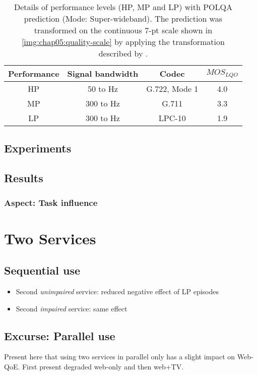 \begin{table}
 \centering
 \begin{tabulary}{\columnwidth}{C|C|C|C}
   Performance & Signal bandwidth & Codec & $MOS_{LQO}$ \\
   \midrule
   HP & 50 to \unit[7000]{Hz}  & G.722, Mode 1 & 4.0 \\ %
   \hline
   MP & 300 to \unit[3400]{Hz} & G.711         & 3.3 \\ %
   \hline
   LP & 300 to \unit[3400]{Hz} & LPC-10        & 1.9 \\ %
   \end{tabulary}
   \caption{Details of performance levels (\ac{HP}, \ac{MP} and \ac{LP}) with \ac{POLQA} prediction (Mode: Super-wideband). The prediction was transformed on the continuous 7-pt scale shown in \autoref{img:chap05:quality-scale} by applying the transformation described by  \cite{koster_comparison_2015}.}
   \label{tab:performance}
\end{table}

\subsection{Experiments}


\subsection{Results}

\subsubsection*{Aspect: Task influence}


\section{Two Services}
\subsection{Sequential use}
\begin{itemize}
\item Second \textit{unimpaired} service: reduced negative effect of LP episodes
\item Second \textit{impaired} service: same effect
\end{itemize}

\subsection{Excurse: Parallel use}
Present here that using two services in parallel only has a slight impact on Web-QoE.
First present degraded web-only and then web+TV.
